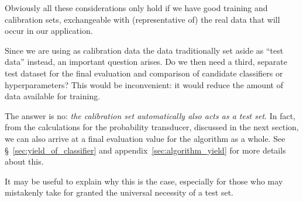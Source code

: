 \documentclass[\ifafour a4paper,12pt,\else a5paper,10pt,\fi%
onecolumn,oneside,article,%
british%
]{memoir}
\makeatletter
\theoremstyle{remark}
\theoremstyle{innote}
\def\sum{\DOTSI\sumop\slimits@}
\newcommand*{\amp}{\&}
\newcommand*{\pencil}{{\fontencoding{U}\fontfamily{fontawesometwo}\selectfont\symbol{210}}}
\newcommand{\mynotep}[1]{{\footnotesize\color{notecolour}\pencil\ #1}}
\renewcommand*{\P}{\mathrm{P}}%
\renewcommand*{\|}[1][]{\nonscript\:#1\vert\nonscript\:\mathopen{}}
\newcommand*{\sect}{\S}%
\newcommand*{\texts}[1]{\text{\small #1}}
\makeatother
\begin{document}
Obviously all these considerations only hold if we have good training and calibration sets, exchangeable with (representative of) the real data that will occur in our application.


\medskip

Since we are using as calibration data the data traditionally set aside as \enquote{test data} instead, an important question arises. Do we then need a third, separate test dataset for the final evaluation and comparison of candidate classifiers or hyperparameters? This would be inconvenient: it would reduce the amount of data available for training.

The answer is no: \emph{the calibration set automatically also acts as a test set}. In fact, from the calculations for the probability transducer, discussed in the next section, we can also arrive at a final evaluation value for the algorithm as a whole. See \sect~\ref{sec:yield_of_classifier} and appendix~\ref{sec:algorithm_yield} for more details about this.

It may be useful to explain why this is the case, especially for those who may mistakenly take for granted the universal necessity of a test set.
\end{document}
